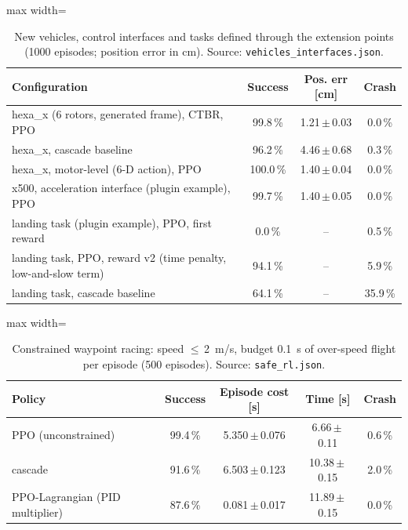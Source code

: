 \begin{table}[!htbp]\centering\small\caption{New vehicles, control interfaces and tasks defined through the extension points (1000 episodes; position error in cm). Source: \texttt{vehicles\_interfaces.json}.}\label{tab:fw_vehicles}
\begin{adjustbox}{max width=\linewidth}\begin{tabular}{lccc}\toprule
Configuration & Success & Pos. err [cm] & Crash\\\midrule
hexa\_x (6 rotors, generated frame), CTBR, PPO & 99.8\,\% & 1.21\,$\pm$\,0.03 & 0.0\,\%\\
hexa\_x, cascade baseline & 96.2\,\% & 4.46\,$\pm$\,0.68 & 0.3\,\%\\
hexa\_x, motor-level (6-D action), PPO & 100.0\,\% & 1.40\,$\pm$\,0.04 & 0.0\,\%\\
x500, acceleration interface (plugin example), PPO & 99.7\,\% & 1.40\,$\pm$\,0.05 & 0.0\,\%\\
landing task (plugin example), PPO, first reward & 0.0\,\% & -- & 0.5\,\%\\
landing task, PPO, reward v2 (time penalty, low-and-slow term) & 94.1\,\% & -- & 5.9\,\%\\
landing task, cascade baseline & 64.1\,\% & -- & 35.9\,\%\\
\bottomrule\end{tabular}\end{adjustbox}
\end{table}

\begin{table}[!htbp]\centering\small\caption{Constrained waypoint racing: speed $\le$\,\SI{2}{m/s}, budget \SI{0.1}{s} of over-speed flight per episode (500 episodes). Source: \texttt{safe\_rl.json}.}\label{tab:fw_safe}
\begin{adjustbox}{max width=\linewidth}\begin{tabular}{lcccc}\toprule
Policy & Success & Episode cost [s] & Time [s] & Crash\\\midrule
PPO (unconstrained) & 99.4\,\% & 5.350\,$\pm$\,0.076 & 6.66\,$\pm$\,0.11 & 0.6\,\%\\
cascade & 91.6\,\% & 6.503\,$\pm$\,0.123 & 10.38\,$\pm$\,0.15 & 2.0\,\%\\
PPO-Lagrangian (PID multiplier) & 87.6\,\% & 0.081\,$\pm$\,0.017 & 11.89\,$\pm$\,0.15 & 0.0\,\%\\
\bottomrule\end{tabular}\end{adjustbox}
\end{table}

